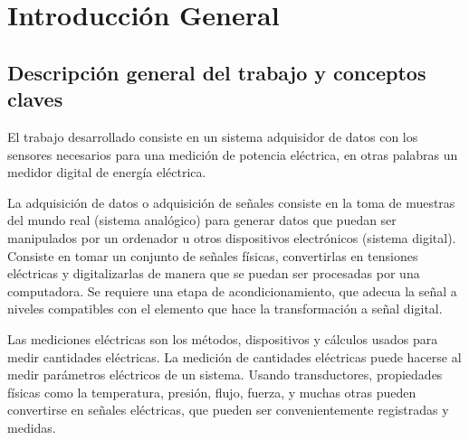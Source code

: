 
\chapter{Introducción General} %

\label{Chapter1} %
\label{IntroGeneral}


\newcommand{\keyword}[1]{\textbf{#1}}
\newcommand{\tabhead}[1]{\textbf{#1}}
\newcommand{\code}[1]{\texttt{#1}}
\newcommand{\file}[1]{\texttt{\bfseries#1}}
\newcommand{\option}[1]{\texttt{\itshape#1}}
\newcommand{\grados}{$^{\circ}$}



\section{Descripción general del trabajo y conceptos claves}

El trabajo desarrollado consiste en un sistema adquisidor de datos con los sensores necesarios para una medición de potencia eléctrica, en otras palabras un medidor digital de energía eléctrica.

La adquisición de datos o adquisición de señales consiste en la toma de muestras del mundo real (sistema analógico) para generar datos que puedan ser manipulados por un ordenador u otros dispositivos electrónicos (sistema digital). Consiste en tomar un conjunto de señales físicas, convertirlas en tensiones eléctricas y digitalizarlas de manera que se puedan ser procesadas por una computadora. Se requiere una etapa de acondicionamiento, que adecua la señal a niveles compatibles con el elemento que hace la transformación a señal digital.\citep{NIDataAdquisition}

Las mediciones eléctricas son los métodos, dispositivos y cálculos usados para medir cantidades eléctricas. La medición de cantidades eléctricas puede hacerse al medir parámetros eléctricos de un sistema. Usando transductores, propiedades físicas como la temperatura, presión, flujo, fuerza, y muchas otras pueden convertirse en señales eléctricas, que pueden ser convenientemente registradas y medidas. \citep{MEcitation}

